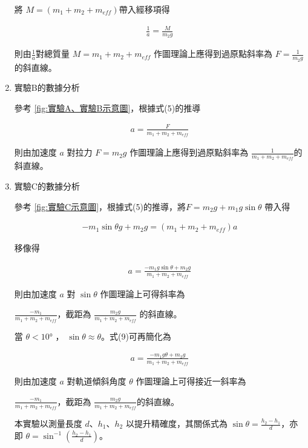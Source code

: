 \documentclass[11pt,a4paper]{article}
\theoremstyle{definition}
\begin{document}
\begin{enumerate}
                將 $M = (m_1 + m_2 + m_{eff})$帶入經移項得

                \begin{gather}
                    \frac{1}{a} = \frac{M}{m_2g}
                \end{gather}                

                則由$\displaystyle\frac{1}{a}$對總質量 $M = m_1 + m_2 + m_{eff}$ 作圖理論上應得到過原點斜率為 $F = \displaystyle\frac{1}{m_2 g}$的斜直線。                

                \item 實驗B的數據分析\par
                參考 \autoref{fig:實驗A、實驗B示意圖}，根據式(5)的推導
                
                \begin{gather}
                    a = \frac{F}{m_1 + m_2 + m_{eff}}
                \end{gather}

                則由加速度 $a$ 對拉力 $F = m_2g$ 作圖理論上應得到過原點斜率為 $\displaystyle{\frac{1}{m_1 + m_2 + m_{eff}}}$的斜直線。

                \item 實驗C的數據分析\par
                參考 \autoref{fig:實驗C示意圖}，根據式(5)的推導，將$F = m_2g + m_1g \sin{\theta}$ 帶入得

                \begin{gather}
                    - m_1 \sin{\theta} g + m_2 g = (m_1 + m_2 + m_{eff}) a
                \end{gather}

                移像得

                \begin{gather}
                    a = \frac{- m_1 g \sin{\theta} + m_2 g}{m_1 + m_2 + m_{eff}}
                \end{gather}

                則由加速度 $a$ 對 $\sin{\theta}$ 作圖理論上可得斜率為\par$\displaystyle\frac{- m_1}{m_1 + m_2 + m_{eff}}$，截距為 $\displaystyle\frac{m_2 g}{m_1 + m_2 + m_{eff}}$ 的斜直線。

                當 $\theta < \ang{10}$ ， $\sin{\theta} \approx \theta$。式(9)可再簡化為

                \begin{gather}
                    a = \frac{- m_1 g \theta + m_2 g}{m_1 + m_2 + m_{eff}}
                \end{gather}

                則由加速度 $a$ 對軌道傾斜角度 $\theta$ 作圖理論上可得接近一斜率為\par$\displaystyle\frac{- m_1}{m_1 + m_2 + m_{eff}}$，截距為 $\displaystyle\frac{m_2 g}{m_1 + m_2 + m_{eff}}$的斜直線。

                本實驗以測量長度 $d、h_1、h_2$ 以提升精確度，其關係式為 $\sin\theta = \displaystyle\frac{h_2 - h_1}{d}$，亦即 $\theta = \sin ^{-1}\left(\displaystyle\frac{h_2 - h_1}{d}\right)$。
            \end{enumerate}
\end{document}
